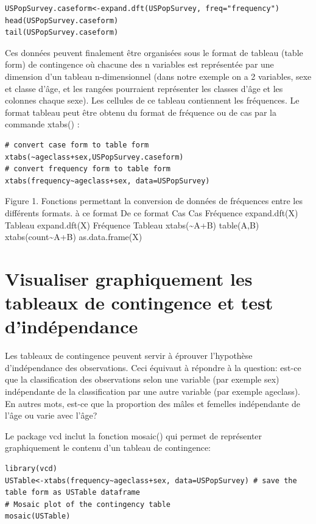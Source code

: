 \documentclass[12pt,]{book}
\begin{document}
\begin{verbatim}
USPopSurvey.caseform<-expand.dft(USPopSurvey, freq="frequency")
head(USPopSurvey.caseform)
tail(USPopSurvey.caseform)
\end{verbatim}

Ces données peuvent finalement être organisées sous le format de
tableau (table form) de contingence où chacune des n variables est
représentée par une dimension d'un tableau n-dimensionnel (dans
notre exemple on a 2 variables, sexe et classe d'âge, et les rangées
pourraient représenter les classes d'âge et les colonnes chaque sexe).
Les cellules de ce tableau contiennent les fréquences. Le format
tableau peut être obtenu du format de fréquence ou de cas par la
commande xtabs() :

\begin{verbatim}
# convert case form to table form
xtabs(~ageclass+sex,USPopSurvey.caseform)
# convert frequency form to table form
xtabs(frequency~ageclass+sex, data=USPopSurvey)
\end{verbatim}

Figure 1. Fonctions permettant la conversion
de données de fréquences entre les différents
formats.
à ce format
De ce format
Cas
Cas
Fréquence expand.dft(X)
Tableau expand.dft(X)
Fréquence Tableau
xtabs(\textasciitilde{}A+B) table(A,B)
xtabs(count\textasciitilde{}A+B)
as.data.frame(X)

\hypertarget{visualiser-graphiquement-les-tableaux-de-contingence-et-test-dinduxe9pendance}{%
\section{Visualiser graphiquement les tableaux de contingence et test d'indépendance}\label{visualiser-graphiquement-les-tableaux-de-contingence-et-test-dinduxe9pendance}}

Les tableaux de contingence peuvent servir à éprouver l'hypothèse
d'indépendance des observations. Ceci équivaut à répondre à la
question: est-ce que la classification des observations selon une
variable (par exemple sex) indépendante de la classification par une
autre variable (par exemple ageclass). En autres mots, est-ce que la
proportion des mâles et femelles indépendante de l'âge ou varie avec
l'âge?

Le package vcd inclut la fonction mosaic() qui permet de représenter
graphiquement le contenu d'un tableau de contingence:

\begin{verbatim}
library(vcd)
USTable<-xtabs(frequency~ageclass+sex, data=USPopSurvey) # save the table form as USTable dataframe
# Mosaic plot of the contingency table
mosaic(USTable)
\end{verbatim}
\end{document}
